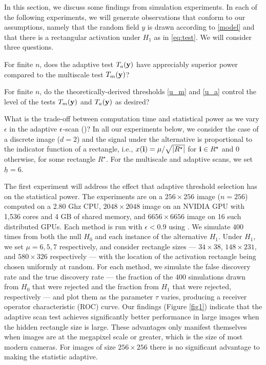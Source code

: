 \documentclass[twoside,11pt]{article}
\newcommand{\eac}[1]{\textcolor{blue}{(#1)}}
\begin{document}
In this section, we discuss some findings from simulation experiments.
In each of the following experiments, we will generate observations that conform to our assumptions, namely that the random field $y$ is drawn according to \eqref{model} and that there is a rectangular activation under $H_1$ as in \eqref{eq:test}.
We will consider three questions.
\benum
\item For finite $n$, does the adaptive test $T_a(\mathbf{y})$ have appreciably superior power compared to the multiscale test $T_m(\mathbf{y})$?  
\item For finite $n$, do the theoretically-derived thresholds \eqref{u_m} and \eqref{u_a} control the level of the tests $T_m(\mathbf{y})$ and $T_a(\mathbf{y})$ as desired?
\item What is the trade-off between computation time and statistical power as we vary $\epsilon$ in the adaptive $\epsilon$-scan ()? 
\eenum
In all our experiments below, we consider the case of a discrete image ($d=2$) and the signal under the alternative is proportional to the indicator function of a rectangle, i.e., $x(\mathbf{i}) = \mu / \sqrt{|R^\star|}$ for $\mathbf{i} \in R^\star$ and $0$ otherwise, for some rectangle $R^\star$.  For the multiscale and adaptive scans, we set $\underline h = 6$.

The first experiment will address the effect that adaptive threshold selection has on the statistical power.
The experiments are on a $256 \times 256$ image ($n = 256$)  computed on a 2.80 Ghz CPU, $2048 \times 2048$ image on an NVIDIA GPU with 1,536 cores and 4 GB of shared memory, and $6656 \times 6656$ image on 16 such distributed GPUs.
Each method is run with $\epsilon < 0.9$ using . 
We simulate $400$ times from both the null $H_0$ and each instance of the alternative $H_1$.  
Under $H_1$, we set $\mu = 6,5,7$ respectively, and consider rectangle sizes --- $34 \times 38$, $148 \times 231$, and $580 \times 326$ respectively --- with the location of the activation rectangle being chosen uniformly at random.
For each method, we simulate the false discovery rate and the true discovery rate --- the fraction of the $400$ simulations drawn from $H_0$ that were rejected and the fraction from $H_1$ that were rejected, respectively --- and plot them as the parameter $\tau$ varies, producing a receiver operator characteristic (ROC) curve. 
Our findings (Figure \ref{fig1}) indicate that the adaptive scan test achieves significantly better performance in large images when the hidden rectangle size is large.
These advantages only manifest themselves when images are at the megapixel scale or greater, which is the size of most modern cameras.
For images of size $256 \times 256$ there is no significant advantage to making the statistic adaptive.
\end{document}
